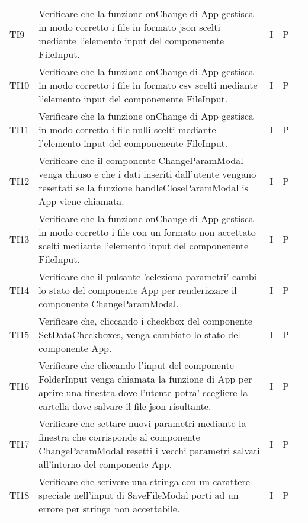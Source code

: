 \begin{longtable} {
		>{}p{15mm} 
		>{}p{79.5mm}
		>{}p{15mm} 
		>{}p{15mm}
		>{}p{0mm}}
    TI9      &  Verificare che la funzione onChange di App gestisca in modo corretto i file in formato json scelti mediante l'elemento input del componenente FileInput.& I & P  &\TBstrut \\ [2mm]
    TI10     &  Verificare che la funzione onChange di App gestisca in modo corretto i file in formato csv scelti mediante l'elemento input del componenente FileInput.& I & P  &\TBstrut \\ [2mm]
    TI11     &  Verificare che la funzione onChange di App gestisca in modo corretto i file nulli scelti mediante l'elemento input del componenente FileInput.& I & P  &\TBstrut \\ [2mm]
    TI12     &  Verificare che il componente ChangeParamModal venga chiuso e che i dati inseriti dall'utente vengano resettati  se la funzione handleCloseParamModal is App viene chiamata.& I & P  &\TBstrut \\ [2mm]
    TI13     &  Verificare che la funzione onChange di App gestisca in modo corretto i file con un formato non accettato scelti mediante l'elemento input del componenente FileInput.& I & P  &\TBstrut \\ [2mm]
    TI14     &  Verificare che il pulsante 'seleziona parametri' cambi lo stato del componente App per renderizzare il componente ChangeParamModal.& I & P  &\TBstrut \\ [2mm]
    TI15     &  Verificare che, cliccando i checkbox del componente SetDataCheckboxes, venga cambiato lo stato del componente App.& I & P  &\TBstrut \\ [2mm]
    TI16     &  Verificare che cliccando l'input del componente FolderInput venga chiamata la funzione di App per aprire una finestra dove l'utente potra' scegliere la cartella dove salvare il file json risultante.& I & P  &\TBstrut \\ [2mm]
    TI17     &  Verificare che settare nuovi parametri mediante la finestra che corrisponde al componente ChangeParamModal resetti i vecchi parametri salvati all'interno del componente App.& I & P  &\TBstrut \\ [2mm]
    TI18     &  Verificare che scrivere una stringa con un carattere speciale nell'input di SaveFileModal porti ad un errore per stringa non accettabile.& I & P  &\TBstrut \\ [2mm]


\end{longtable}
